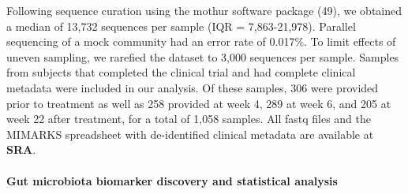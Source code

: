 \documentclass[12pt,]{article}
\let\oldparagraph\paragraph
\renewcommand{\paragraph}[1]{\oldparagraph{#1}\mbox{}}
\begin{document}
Following sequence curation using the mothur software package (49), we
obtained a median of 13,732 sequences per sample (IQR = 7,863-21,978).
Parallel sequencing of a mock community had an error rate of 0.017\%. To
limit effects of uneven sampling, we rarefied the dataset to 3,000
sequences per sample. Samples from subjects that completed the clinical
trial and had complete clinical metadata were included in our analysis.
Of these samples, 306 were provided prior to treatment as well as 258
provided at week 4, 289 at week 6, and 205 at week 22 after treatment,
for a total of 1,058 samples. All fastq files and the MIMARKS
spreadsheet with de-identified clinical metadata are available at
\textbf{SRA}.

\paragraph{Gut microbiota biomarker discovery and statistical
analysis}\label{gut-microbiota-biomarker-discovery-and-statistical-analysis}
\end{document}
